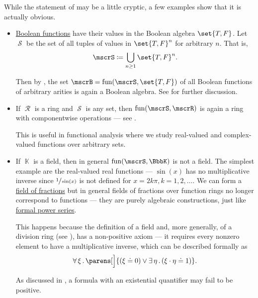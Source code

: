 \begin{example}\label{ex:thm:functions_over_model_of_positive_formulas_form_model}
  While the statement of  may be a little cryptic, a few examples show that it is actually obvious.
  \begin{itemize}
    \item \hyperref[def:boolean_function]{Boolean functions} have their values in the Boolean algebra \( \set{ T, F } \). Let \( \mscrS \) be the set of all tuples of values in \( \set{ T, F }^n \) for arbitrary \( n \). That is,
    \begin{equation*}
      \mscrS \coloneqq \bigcup_{n \geq 1} \set{ T, F }^n.
    \end{equation*}

    Then by , the set \( \mscrB = \fun(\mscrS, \set{ T, F }) \) of all Boolean functions of arbitrary arities is again a Boolean algebra. See  for further discussion.

    \item If \( \mscrR \) is a ring and \( \mscrS \) is any set, then \( \fun(\mscrS, \mscrR) \) is again a ring with componentwise operations --- see .

    This is useful in functional analysis where we study real-valued and complex-valued functions over arbitrary sets.

    \item If \( \BbbK \) is a field, then in general \( \fun(\mscrS, \BbbK) \) is not a field. The simplest example are the real-valued real functions --- \( \sin(x) \) has no multiplicative inverse since \( \sfrac 1 {\sin(x)} \) is not defined for \( x = 2k\pi, k = 1, 2, \ldots \). We can form a \hyperref[def:field_of_fractions]{field of fractions} but in general fields of fractions over function rings no longer correspond to functions --- they are purely algebraic constructions, just like \hyperref[def:formal_power_series]{formal power series}.

    This happens because the definition of a field and, more generally, of a division ring (see ), has a non-positive axiom --- it requires every nonzero element to have a multiplicative inverse, which can be described formally as
    \begin{equation*}
      \qforall \xi \parens[\Big]{ (\xi \doteq 0) \vee \qexists \eta (\xi \cdot \eta \doteq 1) }.
    \end{equation*}

    As discussed in , a formula with an existential quantifier may fail to be positive.
  \end{itemize}
\end{example}
